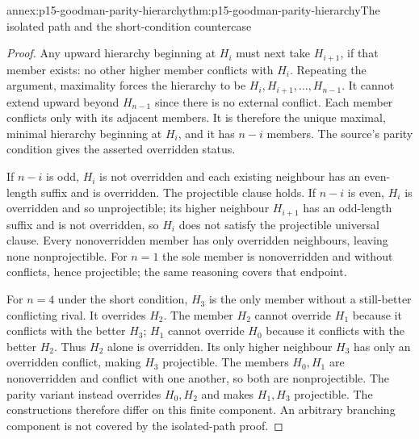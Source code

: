 \begin{annexitem}{annex:p15-goodman-parity-hierarchy}{thm:p15-goodman-parity-hierarchy}{The isolated path and the short-condition countercase}
\begin{proof}
Any upward hierarchy beginning at $H_i$ must next take $H_{i+1}$,
if that member exists: no other higher member conflicts with $H_i$.
Repeating the argument, maximality forces the hierarchy to be
$H_i,H_{i+1},\ldots,H_{n-1}$. It cannot extend upward beyond
$H_{n-1}$ since there is no external conflict. Each member conflicts
only with its adjacent members. It is therefore the unique maximal,
minimal hierarchy beginning at $H_i$, and it has $n-i$ members.
The source's parity condition gives the asserted overridden status.

If $n-i$ is odd, $H_i$ is not overridden and each existing neighbour
has an even-length suffix and is overridden. The projectible clause
holds. If $n-i$ is even, $H_i$ is overridden and so unprojectible; its
higher neighbour $H_{i+1}$ has an odd-length suffix and is not overridden,
so $H_i$ does not satisfy the projectible universal clause. Every
nonoverridden member has only overridden neighbours, leaving none
nonprojectible. For $n=1$ the sole member is nonoverridden and without
conflicts, hence projectible; the same reasoning covers that endpoint.

For $n=4$ under the short condition, $H_3$ is the only member without
a still-better conflicting rival. It overrides $H_2$. The member
$H_2$ cannot override $H_1$ because it conflicts with the better $H_3$;
$H_1$ cannot override $H_0$ because it conflicts with the better $H_2$.
Thus $H_2$ alone is overridden. Its only higher neighbour $H_3$ has
only an overridden conflict, making $H_3$ projectible. The members
$H_0,H_1$ are nonoverridden and conflict with one another, so both
are nonprojectible. The parity variant instead overrides $H_0,H_2$
and makes $H_1,H_3$ projectible. The constructions therefore differ
on this finite component. An arbitrary branching component is not
covered by the isolated-path proof.
\end{proof}
\end{annexitem}

